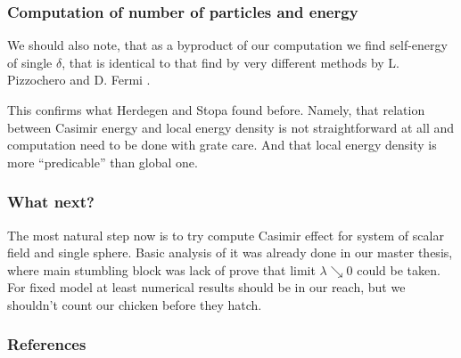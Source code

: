 \documentclass[10pt,t]{beamer}
\begin{document}
\begin{frame}
  \frametitle{Computation of number of particles and energy}


  We should also note, that as a byproduct of our computation we find
  self-energy of single $\delta$, that is identical to that find by very
  different methods by L. Pizzochero and D. Fermi \parencite{}.

  This confirms what Herdegen and Stopa found before. Namely, that relation
  between Casimir energy and local energy density is not straightforward at
  all and computation need to be done with grate care. And that local energy
  density is more ``predicable'' than global one.

\end{frame}





\begin{frame}
  \frametitle{What next?}


  The most natural step now is to try compute Casimir effect for system
  of scalar field and single sphere. Basic analysis of it was already done
  in our master thesis, where main stumbling block was lack of prove
  that limit $\lambda \searrow 0$ could be taken. For fixed model at least numerical
  results should be in our reach, but we shouldn't count our chicken
  before they hatch.

\end{frame}





\begin{frame}
  \frametitle{References}




\end{frame}



\end{document}
